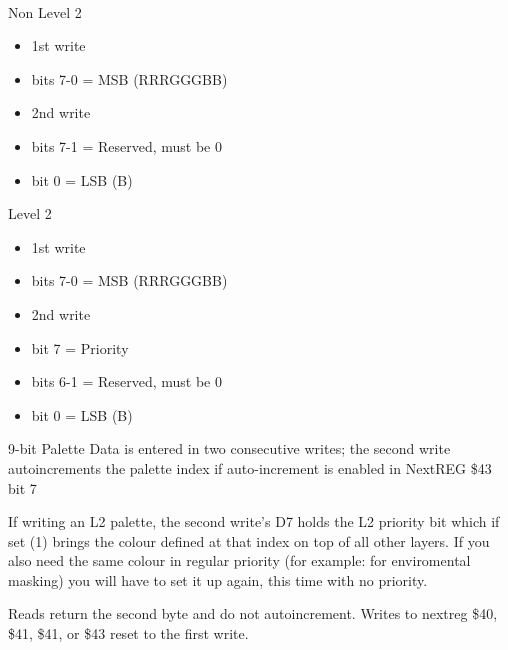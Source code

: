 \\
Non Level 2
\begin{itemize}
\item[] 1st write
\item bits 7-0 = MSB (RRRGGGBB)
\item[] 2nd write
\item bits 7-1 = Reserved, must be 0
\item bit 0 = LSB (B)
\end{itemize}
Level 2
\begin{itemize}
\item[] 1st write
\item bits 7-0 = MSB (RRRGGGBB)
\item[] 2nd write
\item bit 7 = Priority
\item bits 6-1 = Reserved, must be 0
\item bit 0 = LSB (B)
\end{itemize}
9-bit Palette Data is entered in two consecutive writes; the second
write autoincrements the palette index if auto-increment is enabled in
NextREG \$43 bit 7

If writing an L2 palette, the second write's D7 holds the L2 priority
bit which if set (1) brings the colour defined at that index on top of
all other layers. If you also need the same colour in regular priority
(for example: for enviromental masking) you will have to set it up
again, this time with no priority.

Reads return the second byte and do not autoincrement. Writes to
nextreg \$40, \$41, \$41, or \$43 reset to the first write.

